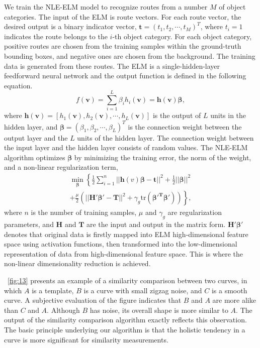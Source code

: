 \documentclass[journal]{IEEEtran}
\begin{document}
We train the NLE-ELM model to recognize routes from a number $M$ of object categories.
The input of the ELM is route vectors.
For each route vector, the desired output is a binary indicator vector, $\boldsymbol{t}=(t_1,t_2,\cdots,t_M)^T$,
where $t_i=1$ indicates the route belongs to the $i$-th object category.  
For each object category, positive routes are chosen from the training samples within the ground-truth bounding boxes,
and negative ones are chosen from the background.
The training data is generated from these routes.
The ELM is a single-hidden-layer feedforward neural network and the output function is defined in the following equation.
\begin{equation}
f(\boldsymbol{v})=\sum_{i=1}^L \beta_i h_i(\boldsymbol{v})=\boldsymbol{h}(\boldsymbol{v})\boldsymbol{\beta},
\end{equation}
where $\boldsymbol{h}(\boldsymbol{v})=\left[h_1(\boldsymbol{v}),h_2(\boldsymbol{v}),\cdots,h_L(\boldsymbol{v})\right]$
is the output of $L$ units in the hidden layer,
and $\boldsymbol\beta=(\beta_1,\beta_2,\cdots,\beta_L)^T$ is the connection weight between the output layer and the $L$ units of the hidden layer.
The connection weight between the input layer and the hidden layer consists of random values.
The NLE-ELM algorithm optimizes $\boldsymbol\beta$ by minimizing the training error, the norm of the weight, and a non-linear regularization term,
\begin{equation}
\begin{split}
\min_{\boldsymbol\beta}\left\{\frac{1}{2}\sum_{i=1}^n||\boldsymbol{h}(v)\boldsymbol\beta-\boldsymbol{t}||^2+\frac{1}{2}||\boldsymbol\beta||^2\right.\\
\left.+\frac{\mu}{2}\left(||\boldsymbol{H'\beta'-T}||^2+\gamma_g\mathrm{tr}(\boldsymbol{\beta'^T\beta'})\right)\right\},
\end{split}
\end{equation}
where $n$ is the number of training samples, 
$\mu$ and $\gamma_g$ are regularization parameters,
and $\boldsymbol{H}$ and $\boldsymbol{T}$ are the input and output in the matrix form.
$\boldsymbol{H'\beta'}$ denotes that original data is firstly mapped into ELM high-dimensional feature space using activation functions, 
then transformed into the low-dimensional representation of data from high-dimensional feature space.
This is where the non-linear dimensionality reduction is achieved.

\figurename~\ref{fig:13} presents an example of a similarity comparison between two curves,
in which $A$ is a template, $B$ is a curve with small zigzag noise, and $C$ is a smooth curve. 
A subjective evaluation of the figure indicates that $B$ and $A$ are more alike than $C$ and $A$. 
Although $B$ has noise, its overall shape is more similar to $A$. 
The output of the similarity comparison algorithm exactly reflects this observation. 
The basic principle underlying our algorithm is that the holistic tendency in a curve is more significant for similarity measurements. 
\end{document}

